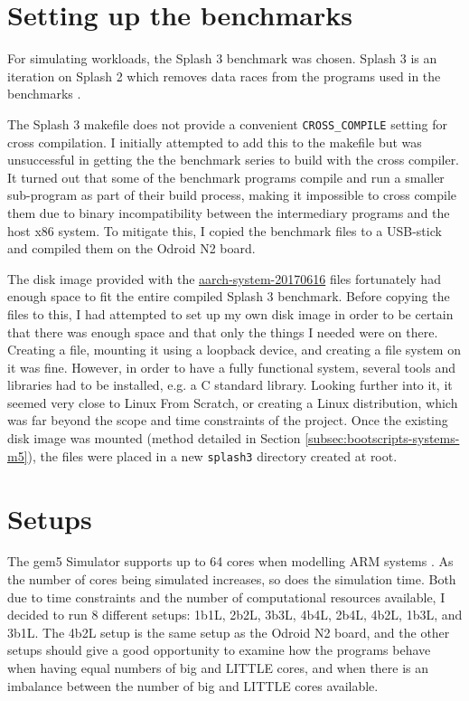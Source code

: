 \section{Setting up the benchmarks}
For simulating workloads, the Splash 3 benchmark \cite{sakalis_splash-3_2016} 
was chosen. Splash 3 is an iteration on Splash 2 which removes data races from 
the programs used in the benchmarks \cite{sakalis_splash-3_2016}.

The Splash 3 makefile does not provide a convenient \texttt{CROSS\_COMPILE} 
setting for cross compilation. I initially attempted to add this to the 
makefile but was unsuccessful in getting the the benchmark series to build with 
the cross compiler. It turned out that some of the benchmark programs compile 
and run a smaller sub-program as part of their build process, making it 
impossible to cross compile them due to binary incompatibility between the 
intermediary programs and the host x86 system. To mitigate this, I copied the 
benchmark files to a USB-stick and compiled them on the Odroid N2 board.

The disk image provided with the 
\href{http://dist.gem5.org/dist/current/arm/aarch-system-20170616.tar.xz}{aarch-system-20170616}
files fortunately had enough space to fit the entire compiled Splash 3 
benchmark. Before copying the files to this, I had attempted to set up my own 
disk image in order to be certain that there was enough space and that only the 
things I needed were on there. Creating a file, mounting it using a loopback 
device, and creating a file system on it was fine. However, in order to have a 
fully functional system, several tools and libraries had to be installed, e.g. 
a C standard library. Looking further into it, it seemed very close to Linux 
From Scratch, or creating a Linux distribution, which was far beyond the scope 
and time constraints of the project. Once the existing disk image was mounted 
(method detailed in Section \ref{subsec:bootscripts-systems-m5}), the files 
were placed in a new \texttt{splash3} directory created at root.

\section{Setups}
The gem5 Simulator supports up to 64 cores when modelling ARM systems 
\cite{noauthor_gem5_nodate}. As the number of cores being simulated increases, 
so does the simulation time. Both due to time constraints and the number of 
computational resources available, I decided to run 8 different setups: 1b1L, 
2b2L, 3b3L, 4b4L, 2b4L, 4b2L, 1b3L, and 3b1L. The 4b2L setup is the same setup 
as the Odroid N2 board, and the other setups should give a good opportunity to 
examine how the programs behave when having equal numbers of big and LITTLE 
cores, and when there is an imbalance between the number of big and LITTLE cores
available.

